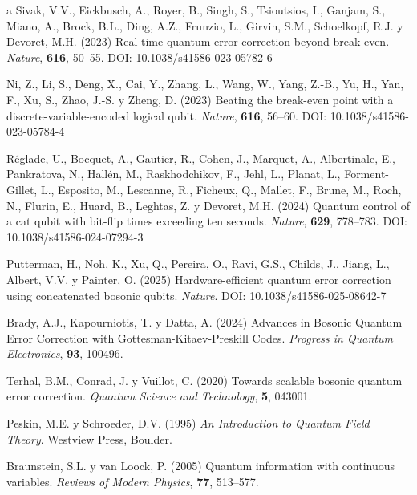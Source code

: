 \documentclass[11pt,a4paper,spanish]{book}
\begin{document}
\begin{thebibliography}{a}
		 Sivak, V.V., Eickbusch, A., Royer, B., Singh, S., Tsioutsios, I., Ganjam, S., Miano, A., Brock, B.L., Ding, A.Z., Frunzio, L., Girvin, S.M., Schoelkopf, R.J. y Devoret, M.H. (2023) Real-time quantum error correction beyond break-even. \textit{Nature}, \textbf{616}, 50--55. DOI: 10.1038/s41586-023-05782-6
		
		 Ni, Z., Li, S., Deng, X., Cai, Y., Zhang, L., Wang, W., Yang, Z.-B., Yu, H., Yan, F., Xu, S., Zhao, J.-S. y Zheng, D. (2023) Beating the break-even point with a discrete-variable-encoded logical qubit. \textit{Nature}, \textbf{616}, 56--60. DOI: 10.1038/s41586-023-05784-4
		
		 Réglade, U., Bocquet, A., Gautier, R., Cohen, J., Marquet, A., Albertinale, E., Pankratova, N., Hallén, M., Raskhodchikov, F., Jehl, L., Planat, L., Forment-Gillet, L., Esposito, M., Lescanne, R., Ficheux, Q., Mallet, F., Brune, M., Roch, N., Flurin, E., Huard, B., Leghtas, Z. y Devoret, M.H. (2024) Quantum control of a cat qubit with bit-flip times exceeding ten seconds. \textit{Nature}, \textbf{629}, 778--783. DOI: 10.1038/s41586-024-07294-3
		
		 Putterman, H., Noh, K., Xu, Q., Pereira, O., Ravi, G.S., Childs, J., Jiang, L., Albert, V.V. y Painter, O. (2025) Hardware-efficient quantum error correction using concatenated bosonic qubits. \textit{Nature}. DOI: 10.1038/s41586-025-08642-7
		
		 Brady, A.J., Kapourniotis, T. y Datta, A. (2024) Advances in Bosonic Quantum Error Correction with Gottesman-Kitaev-Preskill Codes. \textit{Progress in Quantum Electronics}, \textbf{93}, 100496.
		
		 Terhal, B.M., Conrad, J. y Vuillot, C. (2020) Towards scalable bosonic quantum error correction. \textit{Quantum Science and Technology}, \textbf{5}, 043001.
		
		
		 Peskin, M.E. y Schroeder, D.V. (1995) \emph{An Introduction to Quantum Field Theory}. Westview Press, Boulder.
		
			
		
		 Braunstein, S.L. y van Loock, P. (2005) Quantum information with continuous variables. \textit{Reviews of Modern Physics}, \textbf{77}, 513--577.
		

\end{thebibliography}
\end{document}
